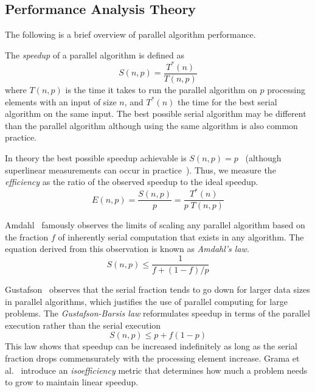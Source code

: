 \documentclass{llncs}
\newcommand*{\lcite}[1]{~\cite{#1}}
\newcommand*{\scite}[1]{~\cite{#1}}
\newcommand{\etal}{et al.\xspace}
\newcommand*{\keyterm}[1]{\emph{#1}}
\begin{document}
\subsection{Performance Analysis Theory}

\noindent
The following is a brief overview of parallel algorithm performance.

The \keyterm{speedup} of a parallel algorithm is defined as
\begin{equation}
  S(n,p) = \frac{T^*(n)}{T(n,p)}
  \label{eq:Speedup}
\end{equation}
where $T(n,p)$ is the time it takes to run the parallel algorithm on $p$
processing elements with an input of size $n$, and $T^*(n)$ the time for the
best serial algorithm on the same input. The best possible serial algorithm
may be different than the parallel algorithm although using the same
algorithm is also common practice.

In theory the best possible speedup achievable is $S(n,p) =
p$\lcite{Faber1986} (although superlinear measurements can occur in
practice\lcite{Gustafson1990}). Thus, we measure the \keyterm{efficiency}
as the ratio of the observed speedup to the ideal speedup.
\begin{equation}
  E(n,p) = \frac{S(n,p)}{p} = \frac{T^*(n)}{p \; T(n,p)}
  \label{eq:Efficiency}
\end{equation}

Amdahl\scite{Amdahl1967} famously observes the limits of scaling any
parallel algorithm based on the fraction $f$ of inherently serial
computation that exists in any algorithm. The equation derived from this
observation is known as \keyterm{Amdahl's law}.
\begin{equation}
  S(n,p) \leq \frac{1}{f + (1-f)/p}
  \label{eq:Amdahl}
\end{equation}

Gustafson\scite{Gustafson1988} observes that the serial fraction tends to
go down for larger data sizes in parallel algorithms, which justifies the
use of parallel computing for large problems. The \keyterm{Gustafson-Barsis
  law} reformulates speedup in terms of the parallel execution rather than
the serial execution
\begin{equation}
  S(n,p) \leq p + f(1-p)
  \label{eq:GustafsonBarsis}
\end{equation}
This law shows that speedup can be increased indefinitely as
long as the serial fraction drops commensurately with the processing
element increase. Grama \etal\scite{Grama1993} introduce an
\keyterm{isoefficiency} metric that determines how much a problem needs to
grow to maintain linear speedup.
\end{document}
